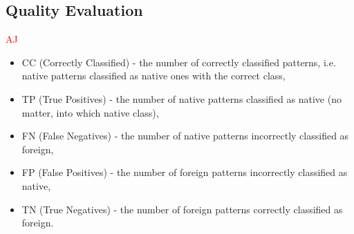 \documentclass{llncs}
\begin{document}
\subsection{Quality Evaluation}
\textcolor{red} {AJ}
\begin{itemize}
\item CC  (Correctly Classified) - the number of correctly classified patterns, i.e. native patterns classified as native ones with the correct class, %
\item TP  (True Positives) - the number of native patterns classified as native (no matter, into which native class),
\item FN  (False Negatives) - the number of native patterns incorrectly classified as foreign,
\item FP  (False Positives) - the number of foreign patterns incorrectly classified as native,
\item TN  (True Negatives) - the number of foreign patterns correctly classified as foreign.
\end{itemize}
\end{document}
